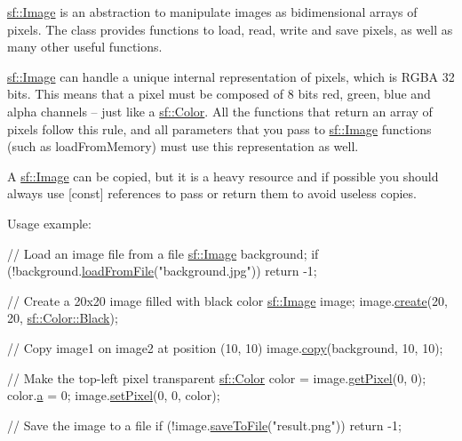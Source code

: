 \hyperlink{classsf_1_1Image}{sf\+::\+Image} is an abstraction to manipulate images as bidimensional arrays of pixels. The class provides functions to load, read, write and save pixels, as well as many other useful functions.

\hyperlink{classsf_1_1Image}{sf\+::\+Image} can handle a unique internal representation of pixels, which is R\+G\+BA 32 bits. This means that a pixel must be composed of 8 bits red, green, blue and alpha channels -- just like a \hyperlink{classsf_1_1Color}{sf\+::\+Color}. All the functions that return an array of pixels follow this rule, and all parameters that you pass to \hyperlink{classsf_1_1Image}{sf\+::\+Image} functions (such as load\+From\+Memory) must use this representation as well.

A \hyperlink{classsf_1_1Image}{sf\+::\+Image} can be copied, but it is a heavy resource and if possible you should always use \mbox{[}const\mbox{]} references to pass or return them to avoid useless copies.

Usage example\+: 
\begin{DoxyCode}
\textcolor{comment}{// Load an image file from a file}
\hyperlink{classsf_1_1Image}{sf::Image} background;
\textcolor{keywordflow}{if} (!background.\hyperlink{classsf_1_1Image_a9e4f2aa8e36d0cabde5ed5a4ef80290b}{loadFromFile}(\textcolor{stringliteral}{"background.jpg"}))
    \textcolor{keywordflow}{return} -1;

\textcolor{comment}{// Create a 20x20 image filled with black color}
\hyperlink{classsf_1_1Image}{sf::Image} image;
image.\hyperlink{classsf_1_1Image_a2a67930e2fd9ad97cf004e918cf5832b}{create}(20, 20, \hyperlink{classsf_1_1Color_a77c688197b981338f0b19dc58bd2facd}{sf::Color::Black});

\textcolor{comment}{// Copy image1 on image2 at position (10, 10)}
image.\hyperlink{classsf_1_1Image_ab2fa337c956f85f93377dcb52153a45a}{copy}(background, 10, 10);

\textcolor{comment}{// Make the top-left pixel transparent}
\hyperlink{classsf_1_1Color}{sf::Color} color = image.\hyperlink{classsf_1_1Image_acf278760458433b2c3626a6980388a95}{getPixel}(0, 0);
color.\hyperlink{classsf_1_1Color_a56dbdb47d5f040d9b78ac6a0b8b3a831}{a} = 0;
image.\hyperlink{classsf_1_1Image_a9fd329b8cd7d4439e07fb5d3bb2d9744}{setPixel}(0, 0, color);

\textcolor{comment}{// Save the image to a file}
\textcolor{keywordflow}{if} (!image.\hyperlink{classsf_1_1Image_a51537fb667f47cbe80395cfd7f9e72a4}{saveToFile}(\textcolor{stringliteral}{"result.png"}))
    \textcolor{keywordflow}{return} -1;
\end{DoxyCode}


